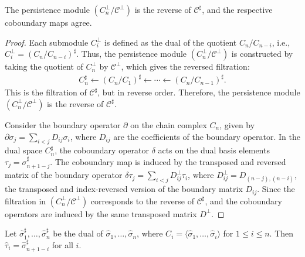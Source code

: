 \begin{proposition}{\cite[Proposition 2.8]{de2011dualities}}
The persistence module $(C_n^\perp/\mathcal{C}^\perp)$ is the reverse of $\mathcal{C}^\sharp$, and the respective coboundary maps agree.
\end{proposition}

\begin{proof}
Each submodule \( C_i^\perp \) is defined as the dual of the quotient \( C_n / C_{n-i} \), i.e., $C_i^\perp = (C_n / C_{n-i})^\sharp$. Thus, the persistence module \( (C_n^\perp / \mathcal{C}^\perp) \) is constructed by taking the quotient of \( C_n^\perp \) by \( \mathcal{C}^\perp \), which gives the reversed filtration:
\begin{align}
C_n^\sharp \leftarrow (C_n / C_1)^\sharp \leftarrow \cdots \leftarrow (C_n / C_{n-1})^\sharp.
\end{align}
This is the filtration of \( \mathcal{C}^\sharp \), but in reverse order. Therefore, the persistence module \( (C_n^\perp / \mathcal{C}^\perp) \) is the reverse of \( \mathcal{C}^\sharp \).

Consider the boundary operator \( \partial \) on the chain complex \( C_n \), given by $\partial \sigma_j = \sum_{i < j} D_{ij} \sigma_i$, where \( D_{ij} \) are the coefficients of the boundary operator. In the dual space \( C_n^\sharp \), the coboundary operator \( \delta \) acts on the dual basis elements \( \tau_j = \sigma^\sharp_{n+1-j} \). The coboundary map is induced by the transposed and reversed matrix of the boundary operator $\delta \tau_j = \sum_{i < j} D_{ij}^\perp \tau_i$, where \( D_{ij}^\perp = D_{(n-j),(n-i)} \), the transposed and index-reversed version of the boundary matrix \( D_{ij} \). Since the filtration in \( (C_n^\perp / \mathcal{C}^\perp) \) corresponds to the reverse of \( \mathcal{C}^\sharp \), and the coboundary operators are induced by the same transposed matrix \( D^\perp \).
\end{proof}

\begin{corollary}{\cite[Proposition 2.10]{de2011dualities}}
Let \( \hat{\sigma}_1^\sharp, \ldots, \hat{\sigma}_n^\sharp \) be the dual of \( \hat{\sigma}_1, \ldots, \hat{\sigma}_n \), where $C_i = \langle \hat{\sigma}_1, \ldots, \hat{\sigma}_i \rangle$ for $1 \leq i \leq n$. Then \( \hat{\tau}_i = \hat{\sigma}_{n+1-i}^\sharp \) for all \( i \).
\end{corollary}

